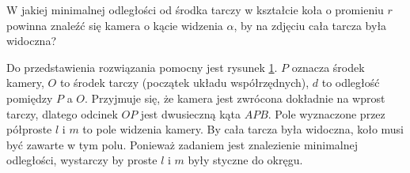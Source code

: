 \begin{question}
W jakiej minimalnej odległości od środka tarczy w kształcie koła o promieniu $r$ powinna znaleźć się kamera o kącie widzenia $\alpha$, by na zdjęciu cała tarcza była widoczna? 
\end{question}

\begin{figure}[h!]
\begin{center}

\end{center}
\label{odleglosc_kamery}
\end{figure} 

Do przedstawienia rozwiązania pomocny jest rysunek \ref{odleglosc_kamery}. $P$ oznacza środek kamery, $O$ to środek tarczy (początek układu współrzędnych), $d$ to odległość pomiędzy $P$ a $O$. Przyjmuje się, że kamera jest zwrócona dokładnie na wprost tarczy, dlatego odcinek $OP$ jest dwusieczną kąta $APB$. Pole wyznaczone przez półproste $l$ i $m$ to pole widzenia kamery. By cała tarcza była widoczna, koło musi być zawarte w tym polu. Ponieważ zadaniem jest znalezienie minimalnej odległości, wystarczy by proste $l$ i $m$ były styczne do okręgu. \newline

